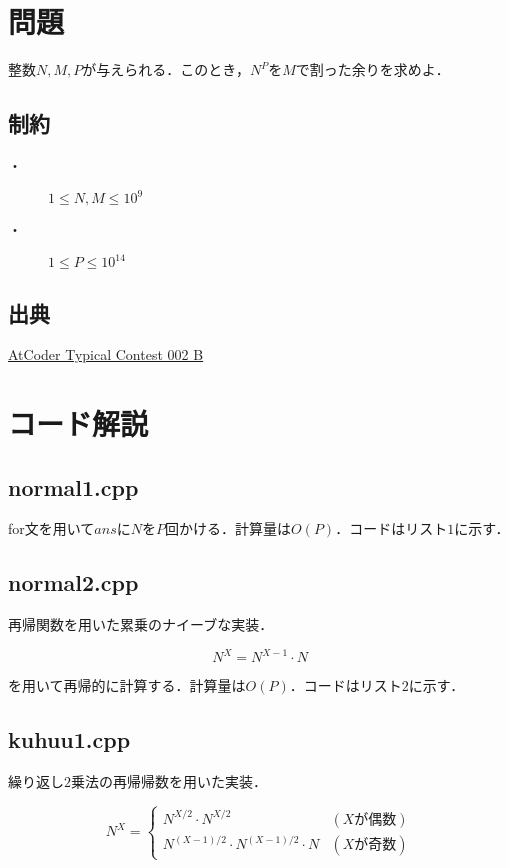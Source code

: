 \documentclass[slide,20pt]{ltjsarticle}
\begin{document}
\section*{問題}
整数$N, M, P$が与えられる．このとき，$N ^ P$を$M$で割った余りを求めよ．

\subsection*{制約}
\begin{description}
\item[・] $1 \leq N, M \leq 10^9$
\item[・] $1 \le P \le 10^{14}$
\end{description}

\subsection*{出典}
\href{https://atcoder.jp/contests/atc002/tasks/atc002_b}{AtCoder Typical Contest 002 B}


\section*{コード解説}
\subsection*{normal1.cpp}
for文を用いて$ans$に$N$を$P$回かける．計算量は$O(P)$．コードはリスト$1$に示す．



\newpage
\subsection*{normal2.cpp}
再帰関数を用いた累乗のナイーブな実装．

\[ N ^ X = N ^ {X - 1} \cdot N \]

を用いて再帰的に計算する．計算量は$O(P)$．コードはリスト$2$に示す．



\newpage

\subsection*{kuhuu1.cpp}
繰り返し$2$乗法の再帰帰数を用いた実装．

\begin{equation*}
  N ^ X = \left\{
    \begin{array}{ll}
      N ^ {X / 2} \cdot N ^ {X / 2} & (X \text{が偶数}) \\
      N ^ {(X - 1) / 2} \cdot N ^ {(X - 1) / 2} \cdot N & (X \text{が奇数})
    \end{array}
  \right.
\end{equation*}
\end{document}
